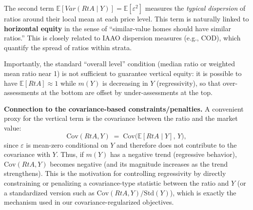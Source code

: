 \documentclass[11pt]{article}
\theoremstyle{plain}
\theoremstyle{definition}
\newcommand{\1}{\mathbf{1}}
\newcommand{\red}[1]{{\color{red} #1}}
\begin{document}
The second term $\mathbb{E}[Var(RtA\mid Y)] = \mathbb{E}[\varepsilon^2]$ measures the \emph{typical dispersion} of ratios around their local mean at each price level. This term is naturally linked to \textbf{horizontal equity} in the sense of ``similar-value homes should have similar ratios.'' This is closely related to IAAO dispersion measures (e.g., COD), which quantify the spread of ratios within strata.

Importantly, the standard ``overall level'' condition (median ratio or weighted mean ratio near 1) is not sufficient to guarantee vertical equity: it is possible to have $\mathbb{E}[RtA]\approx 1$ while $m(Y)$ is decreasing in $Y$ (regressivity), so that over-assessments at the bottom are offset by under-assessments at the top.

\vspace{0.5em}
\noindent \textbf{Connection to the covariance-based constraints/penalties.}
A convenient proxy for the vertical term is the covariance between the ratio and the market value:
\[
\mathrm{Cov}(RtA, Y) \;=\; \mathrm{Cov}\!\big(\mathbb{E}[RtA\mid Y],\, Y\big),
\]
since $\varepsilon$ is mean-zero conditional on $Y$ and therefore does not contribute to the covariance with $Y$. Thus, if $m(Y)$ has a negative trend (regressive behavior), $\mathrm{Cov}(RtA,Y)$ becomes negative (and its magnitude increases as the trend strengthens). This is the motivation for controlling regressivity by directly constraining or penalizing a covariance-type statistic between the ratio and $Y$ (or a standardized version such as $\mathrm{Cov}(RtA,Y)/\mathrm{Std}(Y)$), which is exactly the mechanism used in our covariance-regularized objectives.


\end{document}
